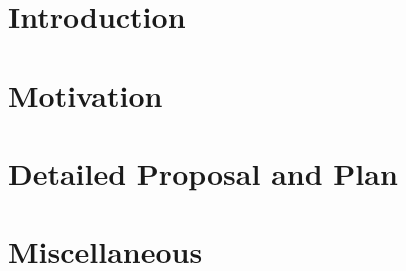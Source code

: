 \documentclass{style}
\begin{document}
\maketitle
\begin{abstract}

\end{abstract}




\section{Introduction}


\section{Motivation}


\section{Detailed Proposal and Plan}


\section{Miscellaneous}


%

%
\small



%
%
%
\end{document}

